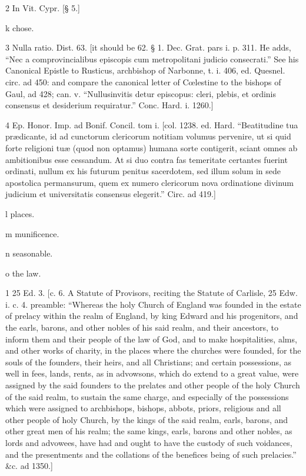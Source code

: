 2
In Vit. Cypr. [§ 5.]

k
chose.

3
Nulla ratio. Dist. 63. [it should be 62. § 1. Dec. Grat. pars i. p. 311. He adds, “Nec a comprovincialibus episcopis cum metropolitani judicio consecrati.” See his Canonical Epistle to Rusticus, archbishop of Narbonne, t. i. 406, ed. Quesnel. circ. ad 450: and compare the canonical letter of Cœlestine to the bishops of Gaul, ad 428; can. v. “Nullusinvitis detur episcopus: cleri, plebis, et ordinis consensus et desiderium requiratur.” Conc. Hard. i. 1260.]

4
Ep. Honor. Imp. ad Bonif. Concil. tom i. [col. 1238. ed. Hard. “Beatitudine tua prædicante, id ad cunctorum clericorum notitiam volumus pervenire, ut si quid forte religioni tuæ (quod non optamus) humana sorte contigerit, sciant omnes ab ambitionibus esse cessandum. At si duo contra fas temeritate certantes fuerint ordinati, nullum ex his futurum penitus sacerdotem, sed illum solum in sede apostolica permansurum, quem ex numero clericorum nova ordinatione divinum judicium et universitatis consensus elegerit.” Circ. ad 419.]

l
places.

m
munificence.

n
seasonable.

o
the law.

1
25 Ed. 3. [c. 6. A Statute of Provisors, reciting the Statute of Carlisle, 25 Edw. i. c. 4. preamble: “Whereas the holy Church of England was founded in the estate of prelacy within the realm of England, by king Edward and his progenitors, and the earls, barons, and other nobles of his said realm, and their ancestors, to inform them and their people of the law of God, and to make hospitalities, alms, and other works of charity, in the places where the churches were founded, for the souls of the founders, their heirs, and all Christians; and certain possessions, as well in fees, lands, rents, as in advowsons, which do extend to a great value, were assigned by the said founders to the prelates and other people of the holy Church of the said realm, to sustain the same charge, and especially of the possessions which were assigned to archbishops, bishops, abbots, priors, religious and all other people of holy Church, by the kings of the said realm, earls, barons, and other great men of his realm; the same kings, earls, barons and other nobles, as lords and advowees, have had and ought to have the custody of such voidances, and the presentments and the collations of the benefices being of such prelacies.” &c. ad 1350.]

